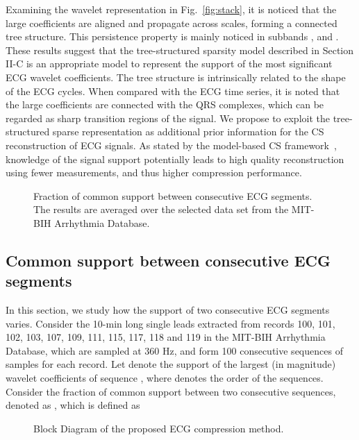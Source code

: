 \documentclass[journal]{IEEEtran}
\begin{document}
Examining the wavelet representation in Fig.~\ref{fig:stack}, it is noticed that the large coefficients are aligned and propagate across scales, forming a connected tree structure. This persistence property is mainly noticed in subbands , and . These results suggest that the tree-structured sparsity model described in Section II-C is an appropriate model to represent the support of the most significant ECG wavelet coefficients. The tree structure is intrinsically related to the shape of the ECG cycles. When compared with the ECG time series, it is noted that the large coefficients are connected with the QRS complexes, which can be regarded as sharp transition regions of the signal. We propose to exploit the tree-structured sparse representation as additional prior information for the CS reconstruction of ECG signals. As stated by the model-based CS framework~\cite{Bara10}, knowledge of the signal support potentially leads to high quality reconstruction using fewer measurements, and thus higher compression performance.
\begin{figure}[t]
\caption{Fraction of common support between consecutive ECG segments. The results are averaged over the selected data set from the MIT-BIH Arrhythmia Database.} \label{fig:2}
\end{figure}


\subsection{Common support between consecutive ECG segments}
\label{ssec:CSPKSS}
In this section, we study how the support of two consecutive ECG segments varies. Consider the 10-min long single leads extracted from records 100, 101, 102, 103, 107, 109, 111, 115, 117, 118 and 119 in the MIT-BIH Arrhythmia Database, which are sampled at 360 Hz, and form 100 consecutive sequences of  samples for each record. Let   denote the support of the  largest (in magnitude) wavelet coefficients of sequence , where  denotes the order of the sequences. Consider the fraction of common support between two consecutive sequences, denoted as , which is defined as


\begin{figure*}[t]
\caption{Block Diagram of the proposed ECG compression method.} \label{fig:3}
\end{figure*}
\end{document}
